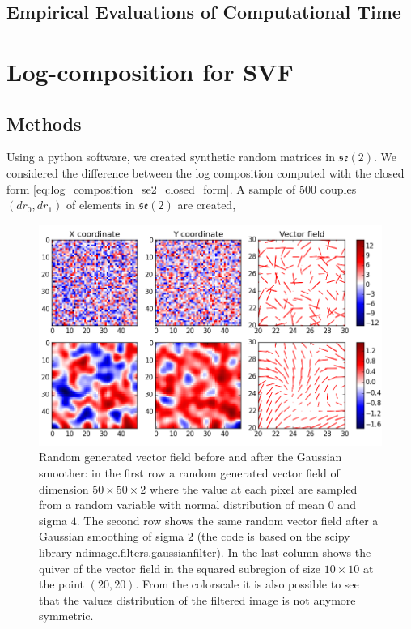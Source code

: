 \subsection{Empirical Evaluations of Computational Time}


\section{Log-composition for SVF}


\subsection{Methods}
Using a python software, we created synthetic random matrices in $\mathfrak{se}(2)$. We considered the difference between the log composition computed with the closed form \ref{eq:log_composition_se2_closed_form}. 
A sample of $500$ couples $(dr_0,dr_1)$ of elements in $\mathfrak{se}(2)$ are created, 



\begin{figure}[!ht]
	\hspace{-1.4cm}
	\includegraphics[scale=0.75]{figures/gaussian_smoothing_effect.png}
	\caption{Random generated vector field before and after the Gaussian smoother: in the first row a random generated vector field of dimension $50\times 50 \times 2$ where the value at each pixel are sampled from a random variable with normal distribution of mean $0$ and sigma $4$. The second row shows the same random vector field after a Gaussian smoothing of sigma $2$ (the code is based on the scipy library ndimage.filters.gaussian\textunderscore filter). In the last column shows the quiver of the vector field in the squared subregion of size $10\times 10$ at the point $(20,20)$. From the colorscale it is also possible to see that the values distribution of the filtered image is not anymore symmetric. }
	\label{fig:svf_gaussian_smoothing_effects}
\end{figure}


